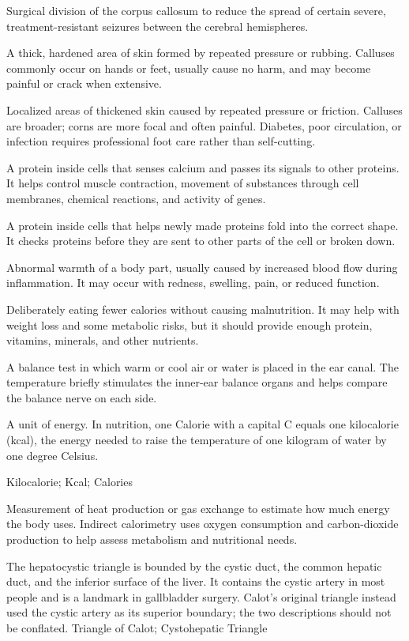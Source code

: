  Surgical division of the corpus callosum to reduce the spread of certain severe, treatment-resistant seizures between the cerebral hemispheres.

 A thick, hardened area of skin formed by repeated pressure or rubbing. Calluses commonly occur on hands or feet, usually cause no harm, and may become painful or crack when extensive.

 Localized areas of thickened skin caused by repeated pressure or friction. Calluses are broader; corns are more focal and often painful. Diabetes, poor circulation, or infection requires professional foot care rather than self-cutting.

 A protein inside cells that senses calcium and passes its signals to other proteins. It helps control muscle contraction, movement of substances through cell membranes, chemical reactions, and activity of genes.

 A protein inside cells that helps newly made proteins fold into the correct shape. It checks proteins before they are sent to other parts of the cell or broken down.

 Abnormal warmth of a body part, usually caused by increased blood flow during inflammation. It may occur with redness, swelling, pain, or reduced function.

 Deliberately eating fewer calories without causing malnutrition. It may help with weight loss and some metabolic risks, but it should provide enough protein, vitamins, minerals, and other nutrients.

 A balance test in which warm or cool air or water is placed in the ear canal. The temperature briefly stimulates the inner-ear balance organs and helps compare the balance nerve on each side.

 A unit of energy. In nutrition, one Calorie with a capital C equals one kilocalorie (kcal), the energy needed to raise the temperature of one kilogram of water by one degree Celsius.

\synonyms
Kilocalorie; Kcal; Calories

 Measurement of heat production or gas exchange to estimate how much energy the body uses. Indirect calorimetry uses oxygen consumption and carbon-dioxide production to help assess metabolism and nutritional needs.

 The hepatocystic triangle is bounded by the cystic duct,
the common hepatic duct, and the inferior surface of the liver. It contains
the cystic artery in most people and is a landmark in gallbladder surgery.
Calot's original triangle instead used the cystic artery as its superior
boundary; the two descriptions should not be conflated.
\synonyms
Triangle of Calot; Cystohepatic Triangle


